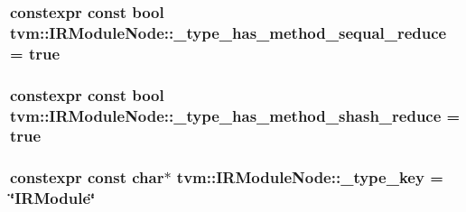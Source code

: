 \subsubsection[{\texorpdfstring{\+\_\+type\+\_\+has\+\_\+method\+\_\+sequal\+\_\+reduce}{_type_has_method_sequal_reduce}}]{\setlength{\rightskip}{0pt plus 5cm}constexpr const bool tvm\+::\+I\+R\+Module\+Node\+::\+\_\+type\+\_\+has\+\_\+method\+\_\+sequal\+\_\+reduce = true\hspace{0.3cm}{\ttfamily [static]}}\hypertarget{classtvm_1_1IRModuleNode_a3c64ad855dbfb5851fc6590f1be417d6}{}\label{classtvm_1_1IRModuleNode_a3c64ad855dbfb5851fc6590f1be417d6}
\subsubsection[{\texorpdfstring{\+\_\+type\+\_\+has\+\_\+method\+\_\+shash\+\_\+reduce}{_type_has_method_shash_reduce}}]{\setlength{\rightskip}{0pt plus 5cm}constexpr const bool tvm\+::\+I\+R\+Module\+Node\+::\+\_\+type\+\_\+has\+\_\+method\+\_\+shash\+\_\+reduce = true\hspace{0.3cm}{\ttfamily [static]}}\hypertarget{classtvm_1_1IRModuleNode_a8900caed3cd5b810aa2a49877028e53d}{}\label{classtvm_1_1IRModuleNode_a8900caed3cd5b810aa2a49877028e53d}
\subsubsection[{\texorpdfstring{\+\_\+type\+\_\+key}{_type_key}}]{\setlength{\rightskip}{0pt plus 5cm}constexpr const char$\ast$ tvm\+::\+I\+R\+Module\+Node\+::\+\_\+type\+\_\+key = \char`\"{}I\+R\+Module\char`\"{}\hspace{0.3cm}{\ttfamily [static]}}\hypertarget{classtvm_1_1IRModuleNode_a6437f77d18cf9a45f2c183d050605d15}{}\label{classtvm_1_1IRModuleNode_a6437f77d18cf9a45f2c183d050605d15}
